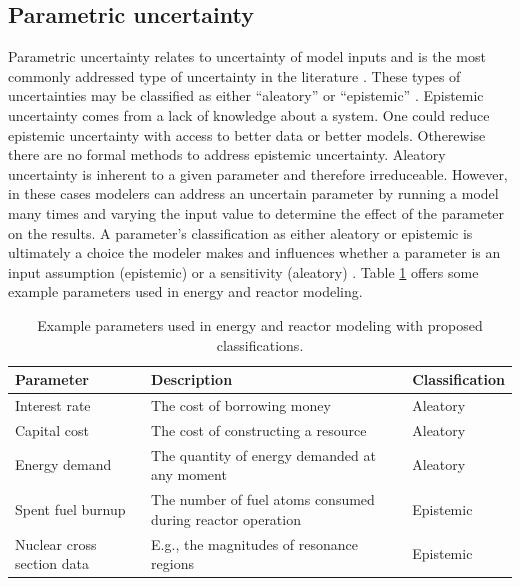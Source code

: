 \subsection{Parametric uncertainty}
Parametric uncertainty relates to uncertainty of model inputs and is the most
commonly addressed type of uncertainty in the literature
\cite{yue_review_2018,decarolis_modelling_2016,morgan_uncertainty_1990}. These
types of uncertainties may be classified as either ``aleatory'' or ``epistemic''
\cite{kiureghian_aleatory_2009,pfenninger_energy_2014}. Epistemic uncertainty
comes from a lack of knowledge about a system. One could reduce epistemic
uncertainty with access to better data or better models. Otherewise there are no
formal methods to address epistemic uncertainty. Aleatory uncertainty is
inherent to a given parameter and therefore irreduceable. However, in these
cases modelers can address an uncertain parameter by running a model many times
and varying the input value to determine the effect of the parameter on the
results. A parameter's classification as either aleatory or epistemic is
ultimately a choice the modeler makes and influences whether a parameter is an
input assumption (epistemic) or a sensitivity (aleatory)
\cite{pfenninger_energy_2014}. Table \ref{tab:param-examples} offers some
example parameters used in energy and reactor modeling.

\begin{table}[ht!]
    \centering
    \caption{Example parameters used in energy and reactor modeling with proposed classifications.}
    \label{tab:param-examples}
    \begin{tabular}{lll} 
        \toprule
        Parameter&Description&Classification\\
        \midrule
        Interest rate&The cost of borrowing money&Aleatory\\
        Capital cost&The cost of constructing a resource&Aleatory\\
        Energy demand&The quantity of energy demanded at any moment&Aleatory\\
        Spent fuel burnup&The number of fuel atoms consumed during reactor
        operation&Epistemic\\
        Nuclear cross section data& E.g., the magnitudes of resonance
        regions&Epistemic\\
        \bottomrule
    \end{tabular}
\end{table}

